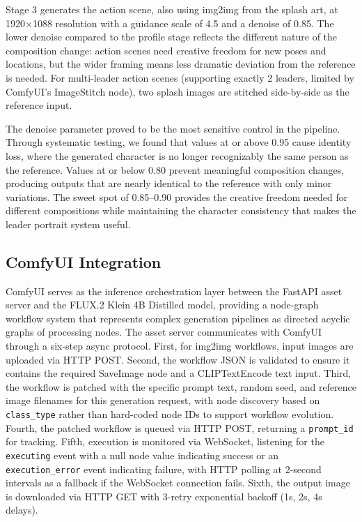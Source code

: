 \documentclass[conference]{IEEEtran}
\begin{document}
Stage 3 generates the action scene, also using img2img from the splash art, at 1920$\times$1088 resolution with a guidance scale of 4.5 and a denoise of 0.85. The lower denoise compared to the profile stage reflects the different nature of the composition change: action scenes need creative freedom for new poses and locations, but the wider framing means less dramatic deviation from the reference is needed. For multi-leader action scenes (supporting exactly 2 leaders, limited by ComfyUI's ImageStitch node), two splash images are stitched side-by-side as the reference input.

The denoise parameter proved to be the most sensitive control in the pipeline. Through systematic testing, we found that values at or above 0.95 cause identity loss, where the generated character is no longer recognizably the same person as the reference. Values at or below 0.80 prevent meaningful composition changes, producing outputs that are nearly identical to the reference with only minor variations. The sweet spot of 0.85--0.90 provides the creative freedom needed for different compositions while maintaining the character consistency that makes the leader portrait system useful.

\subsection{ComfyUI Integration}

ComfyUI serves as the inference orchestration layer between the FastAPI asset server and the FLUX.2 Klein 4B Distilled model, providing a node-graph workflow system that represents complex generation pipelines as directed acyclic graphs of processing nodes. The asset server communicates with ComfyUI through a six-step async protocol. First, for img2img workflows, input images are uploaded via HTTP POST. Second, the workflow JSON is validated to ensure it contains the required SaveImage node and a CLIPTextEncode text input. Third, the workflow is patched with the specific prompt text, random seed, and reference image filenames for this generation request, with node discovery based on \texttt{class\_type} rather than hard-coded node IDs to support workflow evolution. Fourth, the patched workflow is queued via HTTP POST, returning a \texttt{prompt\_id} for tracking. Fifth, execution is monitored via WebSocket, listening for the \texttt{executing} event with a null node value indicating success or an \texttt{execution\_error} event indicating failure, with HTTP polling at 2-second intervals as a fallback if the WebSocket connection fails. Sixth, the output image is downloaded via HTTP GET with 3-retry exponential backoff (1s, 2s, 4s delays).
\end{document}
